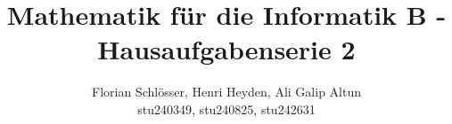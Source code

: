 \documentclass[12pt, a4paper]{article}
\title{Mathematik für die Informatik B - Hausaufgabenserie 2}
\author{Florian Schlösser, Henri Heyden, Ali Galip Altun \\ \small stu240349, stu240825, stu242631}
\date{}
\begin{document}
\maketitle


\doublespacing
\end{document}
